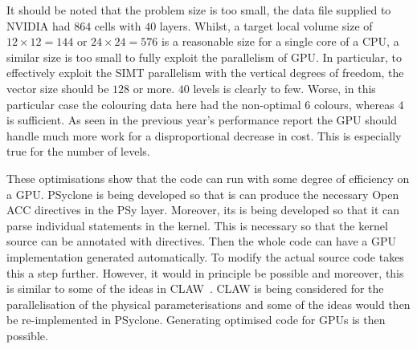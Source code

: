 It should be noted that the problem size is too small, the data file
supplied to NVIDIA had $864$ cells with $40$ layers. Whilst, a target
local volume size of $12\times 12=144$ or $24\times 24=576$ is a
reasonable size for a single core of a CPU, a similar size is too
small to fully exploit the parallelism of GPU. In particular, to
effectively exploit the SIMT parallelism with the vertical degrees of
freedom, the vector size should be $128$ or more. $40$ levels is
clearly to few. Worse, in this particular case the colouring data here
had the non-optimal $6$ colours, whereas $4$ is sufficient. As seen in
the previous year's performance report the GPU should handle much more
work for a disproportional decrease in cost. This is especially true
for the number of levels.

These optimisations show that the code can run with some degree of
efficiency on a GPU. PSyclone is being developed so that is can
produce the necessary Open ACC directives in the PSy layer. Moreover,
its is being developed so that it can parse individual statements in
the kernel. This is necessary so that the kernel source can be
annotated with directives. Then the whole code can have a GPU
implementation generated automatically. To modify the actual source
code takes this a step further. However, it would in principle be
possible and moreover, this is similar to some of the ideas in CLAW~\cite{claw}.
CLAW is being considered for the parallelisation of the physical
parameterisations and some of the ideas would then be re-implemented in
PSyclone. Generating optimised code for GPUs is then possible.

